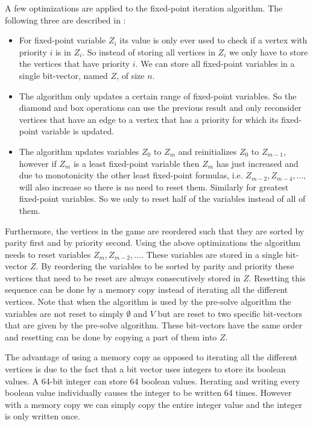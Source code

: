 A few optimizations are applied to the fixed-point iteration algorithm. The following three are described in \cite{FPITE}:
\begin{itemize}
	\item For fixed-point variable $Z_i$ its value is only ever used to check if a vertex with priority $i$ is in $Z_i$. So instead of storing all vertices in $Z_i$ we only have to store the vertices that have priority $i$. We can store all fixed-point variables in a single bit-vector, named $Z$, of size $n$.
	\item The algorithm only updates a certain range of fixed-point variables. So the diamond and box operations can use the previous result and only reconsider vertices that have an edge to a vertex that has a priority for which its fixed-point variable is updated.
	\item The algorithm updates variables $Z_0$ to $Z_m$ and reinitializes $Z_0$ to $Z_{m-1}$, however if $Z_m$ is a least fixed-point variable then $Z_m$ has just increased and due to monotonicity the other least fixed-point formulas, i.e. $Z_{m-2},Z_{m-4},\dots$, will also increase so there is no need to reset them. Similarly for greatest fixed-point variables. So we only to reset half of the variables instead of all of them.
\end{itemize}
Furthermore, the vertices in the game are reordered such that they are sorted by parity first and by priority second. Using the above optimizations the algorithm needs to reset variables $Z_{m}, Z_{m-2},\dots$. These variables are stored in a single bit-vector $Z$. By reordering the variables to be sorted by parity and priority these vertices that need to be reset are always consecutively stored in $Z$. Resetting this sequence can be done by a memory copy instead of iterating all the different vertices. Note that when the algorithm is used by the pre-solve algorithm the variables are not reset to simply $\emptyset$ and $V$ but are reset to two specific bit-vectors that are given by the pre-solve algorithm. These bit-vectors have the same order and resetting can be done by copying a part of them into $Z$.

The advantage of using a memory copy as opposed to iterating all the different vertices is due to the fact that a bit vector uses integers to store its boolean values. A 64-bit integer can store 64 boolean values. Iterating and writing every boolean value individually causes the integer to be written 64 times. However with a memory copy we can simply copy the entire integer value and the integer is only written once.

